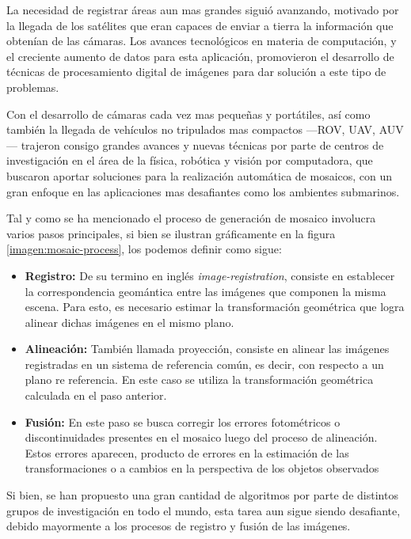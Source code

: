 La necesidad de registrar áreas aun mas grandes siguió avanzando, motivado por la llegada de los satélites que eran capaces de enviar a tierra la información que obtenían de las cámaras. Los avances tecnológicos en materia de computación, y el creciente aumento de datos para esta aplicación, promovieron el desarrollo de técnicas de procesamiento digital de imágenes para dar solución a este tipo de problemas.

Con el desarrollo de cámaras cada vez mas pequeñas y portátiles, así como también la llegada de vehículos no tripulados mas compactos ---ROV, UAV, AUV--- trajeron consigo grandes avances y nuevas técnicas por parte de centros de investigación en el área de la física, robótica y visión por computadora, que buscaron aportar soluciones para la realización automática de mosaicos, con un gran enfoque en las aplicaciones mas desafiantes como los ambientes submarinos.

Tal y como se ha mencionado el proceso de generación de mosaico involucra varios pasos principales, si bien se ilustran gráficamente en la figura \ref{imagen:mosaic-process}, los podemos definir como sigue:

\begin{itemize}
	\item \textbf{Registro:} De su termino en inglés \textit{image-registration}, consiste en establecer la correspondencia geomántica entre las imágenes que componen la misma escena. Para esto, es necesario estimar la transformación geométrica que logra alinear dichas imágenes en el mismo plano.
	
	\item \textbf{Alineación:} También llamada proyección, consiste en alinear las imágenes registradas en un sistema de referencia común, es decir, con respecto a un plano re referencia. En este caso se utiliza la transformación geométrica calculada en el paso anterior.
	
	\item \textbf{Fusión:} En este paso se busca corregir los errores fotométricos o discontinuidades presentes en el mosaico luego del proceso de alineación. Estos errores aparecen, producto de errores en la estimación de las transformaciones o a cambios en la perspectiva de los objetos observados
\end{itemize}

Si bien, se han propuesto una gran cantidad de algoritmos por parte de distintos grupos de investigación en todo el mundo, esta tarea aun sigue siendo desafiante, debido mayormente a los procesos de registro y fusión de las imágenes.


